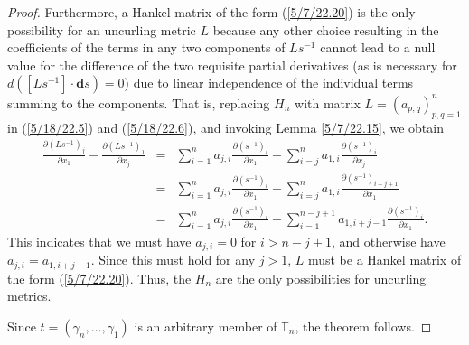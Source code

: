 \documentclass{amsart}
\theoremstyle{definition}
\numberwithin{theorem}{section}
\numberwithin{equation}{section}
\begin{document}
\begin{proof}
Furthermore, a Hankel matrix of the form (\ref{5/7/22.20}) is the only possibility for an uncurling metric $L$ because any other choice resulting in the coefficients of the terms in any two components of $Ls^{-1}$ cannot lead to a null value for the difference of the two requisite partial derivatives (as is necessary for $d\left([L s^{-1}]\cdot \mathbf{d}s\right) = 0$) due to linear independence of the individual terms summing to the components. That is, replacing  $H_n$ with matrix $L=(a_{p,q})_{p,q=1}^n$ in (\ref{5/18/22.5}) 
and (\ref{5/18/22.6}), and invoking Lemma \ref{5/7/22.15}, we obtain
\begin{eqnarray}\nonumber \frac{\partial \left(L s^{-1}\right)_j}{\partial x_1}  -  \frac{\partial \left(L s^{-1}\right)_1}{\partial x_j} &=&  \sum_{i=1}^n a_{j,i}\frac{\partial \left(s^{-1}\right)_i}{\partial x_1} - \sum_{i=j}^n a_{1,i}\frac{\partial \left(s^{-1}\right)_i}{\partial x_j} \\  &=& \sum_{i=1}^n a_{j,i}\frac{\partial \left(s^{-1}\right)_i}{\partial x_1} - \sum_{i=j}^n a_{1,i}\frac{\partial \left(s^{-1}\right)_{i-j+1}}{\partial x_1} \nonumber \\
&=& \sum_{i=1}^n a_{j,i}\frac{\partial \left(s^{-1}\right)_i}{\partial x_1} - \sum_{i=1}^{n-j+1} a_{1,i+j-1}\frac{\partial \left(s^{-1}\right)_i}{\partial x_1}.
\label{5/9/22.10}
\end{eqnarray}
This indicates that we must have $a_{j,i}=0$ for $i>n-j+1$, and otherwise have $a_{j,i} = a_{1,i+j-1}$.  Since this must hold for any $j>1$, $L$ must be a Hankel matrix of the form (\ref{5/7/22.20}).  Thus, the $H_n$ are the only possibilities for uncurling metrics. 

Since $t=(\gamma_n,\dots,\gamma_1)$ is an arbitrary member of $\mathbb{T}_n$, the theorem follows.
\end{proof}
\end{document}
